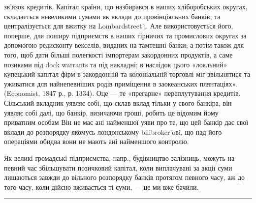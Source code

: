 зв’язок кредитів. Капітал країни, що назбирався в наших хліборобських
округах, складається невеликими сумами як вклади до провінціяльних банків,
та централізується для вжитку на Lombardstreet’i. Але використовується його,
поперше, для поширу підприємств в наших гірничих та промислових округах за
допомогою редисконту векселів, виданих на тамтешні банки; а потім також для того,
щоб дати більші полегкості імпортерам закордонних продуктів, а саме позиками
під dock warrants та під накладні; в наслідок цього «лояльний» купецький
капітал фірм в закордонній та колоніальній торговлі міг звільнятися та уживатися
для найнепевніших родів приміщення в заокеанських плянтаціях». (Economist,
1847 р., р. 1334). Оце — те «прегарне» переплутування кредитів. Сільський
вкладник уявляє собі, що склав вклад тільки у свого банкіра, він уявляє собі
далі, що банкір, визичаючи гроші, робить це відомим йому приватним особам
Він не має ані найменшої уяви про те, що цей банкір дає свої вклади до розпорядку
якомусь лондонському bilibroker’oвi, що над його операціями обидва
вони не мають ані найменшого контролю.

Як великі громадські підприємства, напр., будівництво залізниць, можуть
на певний час збільшувати позичковий капітал, коли виплачувані за акції
суми лишаються завжди до вільного розпорядку банків протягом певного часу,
аж до того часу, коли дійсно вживається ті суми, — це ми вже бачили.
\pfbreak
